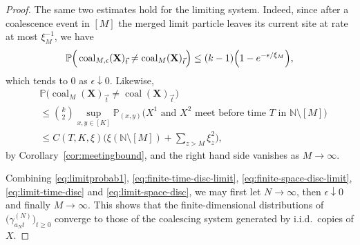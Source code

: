 \documentclass[11pt,a4paper]{scrartcl}
\numberwithin{equation}{section}
\theoremstyle{plain}
\theoremstyle{definition}
\theoremstyle{remark}
\newcommand{\bN}{\ensuremath{\mathbb{N}}}
\newcommand{\bP}{\ensuremath{\mathbb{P}}}
\begin{document}
\begin{proof}
	The same two estimates hold for the limiting system. Indeed, since after a coalescence event in $[M]$ the merged limit particle leaves its current site at rate at most $\xi_M^{-1}$, we have
	\begin{equation}\label{eq:limit-time-disc}
		\bP\Big( \operatorname{coal}_{M,\epsilon}(\mathbf{X})_{\vec{t}}\neq \operatorname{coal}_{M}(\mathbf{X})_{\vec{t}} \Big)
		\leq (k-1)\Big(1-\textup{e}^{-\epsilon/\xi_M}\Big),
	\end{equation}
	which tends to $0$ as $\epsilon\downarrow 0$. Likewise,
	\begin{align}
		& \bP\big( \operatorname{coal}_{M} (\mathbf{X})_{\vec{t}}\neq \operatorname{coal}(\mathbf{X})_{\vec{t}} \big)\nonumber\\
		&\leq \binom{k}{2}\sup_{x,y\in[K]}\bP_{(x,y)}\Big( X^{1}\text{ and } X^{2} \text{ meet before time }T \text{ in }\bN\setminus[M]\Big)\nonumber\\
		&\leq C(T,K,\xi)\Big(\xi(\bN\setminus[M])+\sum_{z>M}\xi_z^2\Big), \label{eq:limit-space-disc}
	\end{align}
	by Corollary~\ref{cor:meetingbound}, and the right hand side vanishes as $M\to\infty$.

	Combining \eqref{eq:limitprobab1}, \eqref{eq:finite-time-disc-limit}, \eqref{eq:finite-space-disc-limit}, \eqref{eq:limit-time-disc} and \eqref{eq:limit-space-disc}, we may first let $N\to\infty$, then $\epsilon\downarrow 0$ and finally $M\to\infty$. This shows that the finite-dimensional distributions of $\big(\gamma_{a_N t}^{(N)}\big)_{t\geq 0}$ converge to those of the coalescing system generated by i.i.d.\ copies of $X$.
\end{proof}
\end{document}
